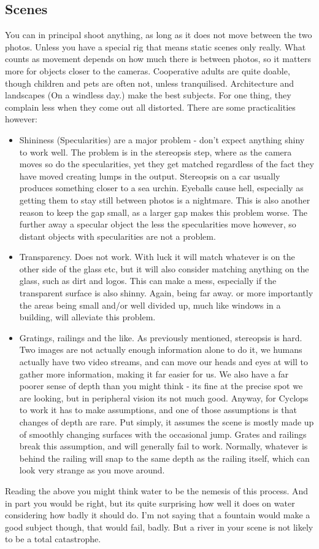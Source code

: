 \documentclass[10pt,a4paper,twoside]{article}
\begin{document}
\subsection{Scenes}
You can in principal shoot anything, as long as it does not move between the two photos.
Unless you have a special rig that means static scenes only really.
What counts as movement depends on how much there is between photos, so it matters more for objects closer to the cameras.
Cooperative adults are quite doable, though children and pets are often not, unless tranquilised.
Architecture and landscapes (On a windless day.) make the best subjects.
For one thing, they complain less when they come out all distorted.
There are some practicalities however:
\begin{itemize}
\item Shininess (Specularities) are a major problem - don't expect anything shiny to work well. The problem is in the stereopsis step, where as the camera moves so do the specularities, yet they get matched regardless of the fact they have moved creating lumps in the output. Stereopsis on a car usually produces something closer to a sea urchin. Eyeballs cause hell, especially as getting them to stay still between photos is a nightmare. This is also another reason to keep the gap small, as a larger gap makes this problem worse. The further away a specular object the less the specularities move however, so distant objects with specularities are not a problem.
\item Transparency. Does not work. With luck it will match whatever is on the other side of the glass etc, but it will also consider matching anything on the glass, such as dirt and logos. This can make a mess, especially if the transparent surface is also shinny. Again, being far away. or more importantly the areas being small and/or well divided up, much like windows in a building, will alleviate this problem.
\item Gratings, railings and the like. As previously mentioned, stereopsis is hard. Two images are not actually enough information alone to do it, we humans actually have two video streams, and can move our heads and eyes at will to gather more information, making it far easier for us. We also have a far poorer sense of depth than you might think - its fine at the precise spot we are looking, but in peripheral vision its not much good. Anyway, for Cyclops to work it has to make assumptions, and one of those assumptions is that changes of depth are rare. Put simply, it assumes the scene is mostly made up of smoothly changing surfaces with the occasional jump. Grates and railings break this assumption, and will generally fail to work. Normally, whatever is behind the railing will snap to the same depth as the railing itself, which can look very strange as you move around.
\end{itemize}
Reading the above you might think water to be the nemesis of this process. And in part you would be right, but its quite surprising how well it does on water considering how badly it should do. I'm not saying that a fountain would make a good subject though, that would fail, badly. But a river in your scene is not likely to be a total catastrophe.
\end{document}
